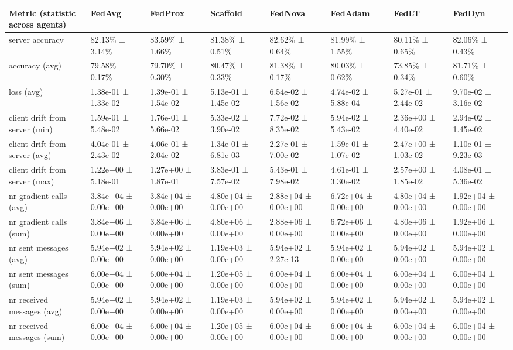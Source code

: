 \begin{tabular}{llllllll}
\hline
 Metric (statistic across agents)   & FedAvg              & FedProx             & Scaffold            & FedNova             & FedAdam             & FedLT               & FedDyn              \\
\hline
 server accuracy                    & 82.13\% ± 3.14\%      & 83.59\% ± 1.66\%      & 81.38\% ± 0.51\%      & 82.62\% ± 0.64\%      & 81.99\% ± 1.55\%      & 80.11\% ± 0.65\%      & 82.06\% ± 0.43\%      \\
 accuracy (avg)                     & 79.58\% ± 0.17\%      & 79.70\% ± 0.30\%      & 80.47\% ± 0.33\%      & 81.38\% ± 0.17\%      & 80.03\% ± 0.62\%      & 73.85\% ± 0.34\%      & 81.71\% ± 0.60\%      \\
 loss (avg)                         & 1.38e-01 ± 1.33e-02 & 1.39e-01 ± 1.54e-02 & 5.13e-01 ± 1.45e-02 & 6.54e-02 ± 1.56e-02 & 4.74e-02 ± 5.88e-04 & 5.27e-01 ± 2.44e-02 & 9.70e-02 ± 3.16e-02 \\
 client drift from server (min)     & 1.59e-01 ± 5.48e-02 & 1.76e-01 ± 5.66e-02 & 5.33e-02 ± 3.90e-02 & 7.72e-02 ± 8.35e-02 & 5.94e-02 ± 5.43e-02 & 2.36e+00 ± 4.40e-02 & 2.94e-02 ± 1.45e-02 \\
 client drift from server (avg)     & 4.04e-01 ± 2.43e-02 & 4.06e-01 ± 2.04e-02 & 1.34e-01 ± 6.81e-03 & 2.27e-01 ± 7.00e-02 & 1.59e-01 ± 1.07e-02 & 2.47e+00 ± 1.03e-02 & 1.10e-01 ± 9.23e-03 \\
 client drift from server (max)     & 1.22e+00 ± 5.18e-01 & 1.27e+00 ± 1.87e-01 & 3.83e-01 ± 7.57e-02 & 5.43e-01 ± 7.98e-02 & 4.61e-01 ± 3.30e-02 & 2.57e+00 ± 1.85e-02 & 4.08e-01 ± 5.36e-02 \\
 nr gradient calls (avg)            & 3.84e+04 ± 0.00e+00 & 3.84e+04 ± 0.00e+00 & 4.80e+04 ± 0.00e+00 & 2.88e+04 ± 0.00e+00 & 6.72e+04 ± 0.00e+00 & 4.80e+04 ± 0.00e+00 & 1.92e+04 ± 0.00e+00 \\
 nr gradient calls (sum)            & 3.84e+06 ± 0.00e+00 & 3.84e+06 ± 0.00e+00 & 4.80e+06 ± 0.00e+00 & 2.88e+06 ± 0.00e+00 & 6.72e+06 ± 0.00e+00 & 4.80e+06 ± 0.00e+00 & 1.92e+06 ± 0.00e+00 \\
 nr sent messages (avg)             & 5.94e+02 ± 0.00e+00 & 5.94e+02 ± 0.00e+00 & 1.19e+03 ± 0.00e+00 & 5.94e+02 ± 2.27e-13 & 5.94e+02 ± 0.00e+00 & 5.94e+02 ± 0.00e+00 & 5.94e+02 ± 0.00e+00 \\
 nr sent messages (sum)             & 6.00e+04 ± 0.00e+00 & 6.00e+04 ± 0.00e+00 & 1.20e+05 ± 0.00e+00 & 6.00e+04 ± 0.00e+00 & 6.00e+04 ± 0.00e+00 & 6.00e+04 ± 0.00e+00 & 6.00e+04 ± 0.00e+00 \\
 nr received messages (avg)         & 5.94e+02 ± 0.00e+00 & 5.94e+02 ± 0.00e+00 & 1.19e+03 ± 0.00e+00 & 5.94e+02 ± 0.00e+00 & 5.94e+02 ± 0.00e+00 & 5.94e+02 ± 0.00e+00 & 5.94e+02 ± 0.00e+00 \\
 nr received messages (sum)         & 6.00e+04 ± 0.00e+00 & 6.00e+04 ± 0.00e+00 & 1.20e+05 ± 0.00e+00 & 6.00e+04 ± 0.00e+00 & 6.00e+04 ± 0.00e+00 & 6.00e+04 ± 0.00e+00 & 6.00e+04 ± 0.00e+00 \\
\hline
\end{tabular}